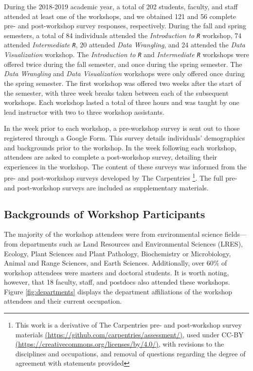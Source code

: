 \documentclass[12pt]{article}
\begin{document}
\quad During the 2018-2019 academic year, a total of 202 students, faculty, and
staff attended at least one of the workshops, and we obtained 121 and 56 
complete pre- and post-workshop survey responses, respectively. During the fall 
and spring semesters, a total of 84 individuals attended the \emph{Introduction
to \texttt{R}} workshop, 74 attended \emph{Intermediate \texttt{R}}, 20 attended
\emph{Data Wrangling}, and 24 attended the \emph{Data Visualization} workshop.
The \emph{Introduction to \texttt{R}} and \emph{Intermediate \texttt{R}}
workshops were offered twice during the fall semester, and once during the
spring semester. The \emph{Data Wrangling} and \emph{Data Visualization}
workshops were only offered once during the spring semester. The first workshop
was offered two weeks after the start of the semester, with three week breaks 
taken between each of the subsequent workshops. Each workshop lasted a total of
three hours and was taught by one lead instructor with two to three workshop
assistants. 

\quad In the week prior to each workshop, a pre-workshop survey is
sent out to those registered through a Google Form. This survey details 
individuals' demographics and backgrounds prior to the workshop. In the week
following each workshop, attendees are asked to complete a post-workshop survey,
detailing their experiences in the workshop. The content of these surveys was
informed from the pre- and post-workshop surveys developed by The Carpentries
\footnote{This work is a derivative of The Carpentries pre- and post-workshop
survey materials \href{https://github.com/carpentries/assessment/}{(https://github.com/carpentries/assessment/)}, used under CC-BY \href{https://creativecommons.org/licenses/by/4.0/}{(https://creativecommons.org/licenses/by/4.0/)}, with revisions to the disciplines and occupations, and removal of questions
regarding the degree of agreement with statements provided}. The full pre- and
post-workshop surveys are included as supplementary materials.

\subsection{Backgrounds of Workshop Participants}

\quad The majority of the workshop attendees were from environmental science
fields---from departments such as Land Resources and Environmental Sciences
(LRES), Ecology, Plant Sciences and Plant Pathology, Biochemistry or
Microbiology, Animal and Range Sciences, and Earth Sciences. Additionally, over
60\% of workshop attendees were masters and doctoral students. It is worth
noting, however, that 18 faculty, staff, and postdocs also attended these
workshops. Figure \ref{fig:departments} displays the department affiliations of
the workshop attendees and their current occupation. 
\end{document}
